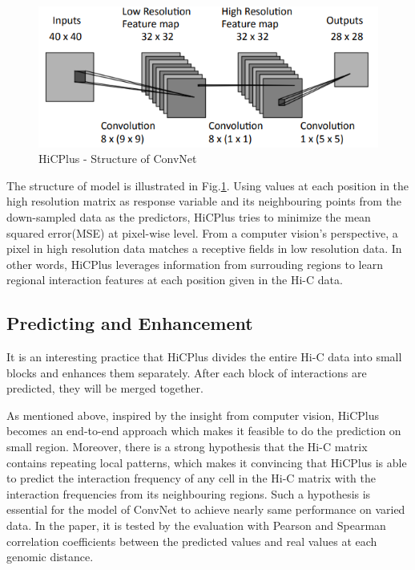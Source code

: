 \documentclass{article}
\begin{document}
\begin{figure}[H]
    \centering
    \includegraphics[scale=0.5]{./docs/hicplus_model.png}
    \caption{HiCPlus - Structure of ConvNet}\label{hicplusstruct}
\end{figure}

The structure of model is illustrated in Fig.\ref{hicplusstruct}. Using values at each position in the high resolution matrix as response  variable and its neighbouring points from the down-sampled data as the predictors, HiCPlus tries to minimize the mean squared error(MSE) at pixel-wise level. From a computer vision's perspective, a pixel in high resolution data matches a receptive fields in low resolution data. In other words, HiCPlus leverages information from surrouding regions to learn regional interaction features at each position given in the Hi-C data.


\subsection{Predicting and Enhancement}
It is an interesting practice that HiCPlus divides the entire Hi-C data into small blocks and enhances them separately. After each block of interactions are predicted, they will be merged together. 

As mentioned above, inspired by the insight from computer vision, HiCPlus becomes an end-to-end approach which makes it feasible to do the prediction on small region. Moreover, there is a strong hypothesis that the Hi-C matrix contains repeating local patterns, which makes it convincing that HiCPlus is able to predict the interaction frequency of any cell in the Hi-C matrix with the interaction frequencies from its neighbouring regions. Such a hypothesis is essential for the model of ConvNet to achieve nearly same performance on varied data. In the paper\cite{hicplus}, it is tested by the evaluation with Pearson and Spearman correlation coefficients between the predicted values and real values at each genomic distance.
\end{document}
